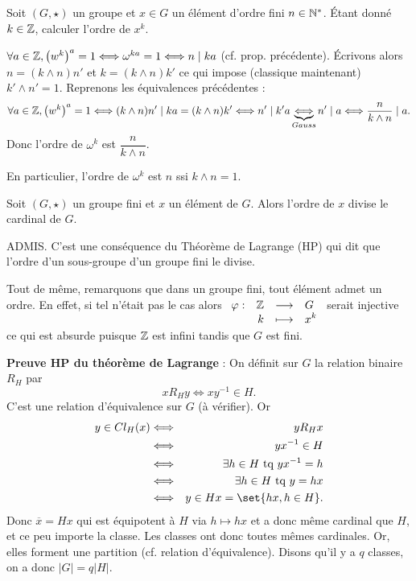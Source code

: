 \documentclass{magnolia}
\begin{document}
\begin{exoUnique}
\exo Soit $(G,\star)$ un groupe et $x\in G$ un élément d'ordre fini $n\in{\mathbb{N}^*}$.
  Étant donné $k\in\mathbb{Z}$, calculer l'ordre de $x^k$.
  \begin{sol}
  $\forall a \in \mathbb{Z}, \left(w^k\right)^a=1\Longleftrightarrow \omega^{ka}=1 \Longleftrightarrow n\mid ka$ (cf. prop. précédente).
  \'Ecrivons alors $n=(k\wedge n)n'$ et $k=(k\wedge n)k'$ ce qui impose (classique maintenant) $k'\wedge n'=1$. Reprenons les équivalences précédentes :
  $$\forall a \in \mathbb{Z}, \left(w^k\right)^a=1\Longleftrightarrow (k\wedge n)n'\mid ka=(k\wedge n)k' \Longleftrightarrow n'\mid k'a \underbrace{\Longleftrightarrow}_{Gauss} n'\mid a \Longleftrightarrow \dfrac{n}{k\wedge n}\mid a.$$ Donc l'ordre de $\omega^k$ est $\dfrac{n}{k\wedge n}$.
  
  En particulier, l'ordre de $\omega^k$ est $n$ ssi $k\wedge n=1$.
  
  \end{sol}
\end{exoUnique}

\begin{theoreme}[nom={Théorème de \nom{Lagrange}}]
Soit $(G,\star)$ un groupe fini et $x$ un élément de $G$. Alors l'ordre de $x$
divise le cardinal de $G$.
\end{theoreme}

\begin{preuve}
ADMIS. C'est une conséquence du Théorème de Lagrange (HP) qui dit que l'ordre d'un sous-groupe d'un groupe fini le divise.
\medskip

Tout de même, remarquons que dans un groupe fini, tout élément admet un ordre. En effet, si tel n'était pas le cas alors $\begin{array}[t]{lrcl} \displaystyle{\varphi} : & \displaystyle{\mathbb{Z}} & \longrightarrow & \displaystyle{G} \\ & \displaystyle{k} & \longmapsto & \displaystyle{x^k} \end{array}$ serait injective ce qui est absurde puisque $\mathbb{Z}$ est infini tandis que $G$ est fini.
\bigskip

\textbf{Preuve HP du théorème de Lagrange} :
On définit sur $G$ la relation binaire $R_H$ par $$x R_H y \Longleftrightarrow xy^{-1} \in H.$$
C'est une relation d'équivalence sur $G$ (à vérifier). Or
\begin{eqnarray*}
y\in Cl_H(x) &\Longleftrightarrow& y R_H x \\
&\Longleftrightarrow& yx^{-1}\in H \\
&\Longleftrightarrow& \exists h \in H \text{ tq } yx^{-1}=h \\
&\Longleftrightarrow& \exists h \in H \text{ tq } y=hx \\
&\Longleftrightarrow& y\in Hx=\set{hx, h\in H}.
\end{eqnarray*}
Donc $\overline{x}=Hx$ qui est équipotent à $H$ via $h\mapsto hx$ et a donc même cardinal que $H$, et ce peu importe la classe. Les classes ont donc toutes mêmes cardinales. Or, elles forment une partition (cf. relation d'équivalence). Disons qu'il y a $q$ classes, on a donc $|G|=q|H|$.
\end{preuve}
\end{document}
